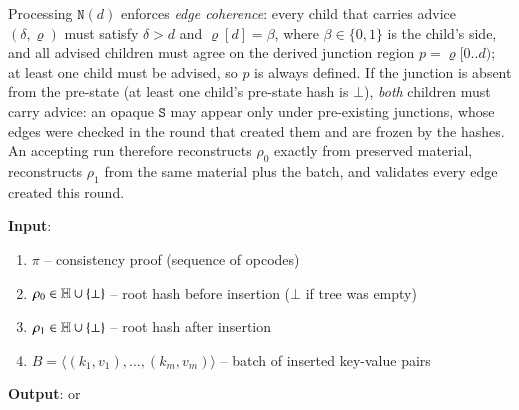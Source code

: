 Processing $\mathtt{N}(d)$ enforces \emph{edge coherence}: every child that carries advice $(\delta, \varrho)$ must satisfy $\delta > d$ and $\varrho[d] = \beta$, where $\beta \in \{0, 1\}$ is the child's side, and all advised children must agree on the derived junction region $p = \varrho[0..d)$; at least one child must be advised, so $p$ is always defined. If the junction is absent from the pre-state (at least one child's pre-state hash is $\bot$), \emph{both} children must carry advice: an opaque $\mathtt{S}$ may appear only under pre-existing junctions, whose edges were checked in the round that created them and are frozen by the hashes. An accepting run therefore reconstructs $\rho_0$ exactly from preserved material, reconstructs $\rho_1$ from the same material plus the batch, and validates every edge created this round.

\textbf{Input}:
\begin{enumerate}
	\item $\pi$ -- consistency proof (sequence of opcodes)
	\item $\rho_0 \in \mathbb{H} \cup\{\bot\}$ -- root hash before insertion ($\bot$ if tree was empty)
	\item $\rho_1 \in \mathbb{H} \cup\{\bot\}$ -- root hash after insertion
	\item $B = \langle (k_1, v_1), \ldots, (k_m, v_m) \rangle$ -- batch of inserted key-value pairs
\end{enumerate}

\textbf{Output}: \TRUE or \FALSE

